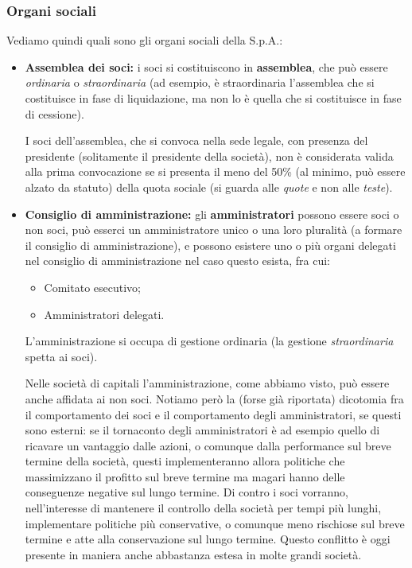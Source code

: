 \documentclass[a4paper,11pt]{article}
\begin{document}
\subsubsection{Organi sociali}
Vediamo quindi quali sono gli organi sociali della S.p.A.: 
\begin{itemize}
	\item
		\textbf{Assemblea dei soci:} i soci si costituiscono in \textbf{assemblea}, che può essere \textit{ordinaria} o \textit{straordinaria} (ad esempio, è straordinaria l'assemblea che si costituisce in fase di liquidazione, ma non lo è quella che si costituisce in fase di cessione).

I soci dell'assemblea, che si convoca nella sede legale, con presenza del presidente (solitamente il presidente della società), non è considerata valida alla prima convocazione se si presenta il meno del 50\% (al minimo, può essere alzato da statuto) della quota sociale (si guarda alle \textit{quote} e non alle \textit{teste}).

\item \textbf{Consiglio di amministrazione:} gli \textbf{amministratori} possono essere soci o non soci, può esserci un amministratore unico o una loro pluralità (a formare il consiglio di amministrazione), e possono esistere uno o più organi delegati nel consiglio di amministrazione nel caso questo esista, fra cui:
		\begin{itemize}
			\item Comitato esecutivo;
			\item Amministratori delegati.
		\end{itemize}
		L'amministrazione si occupa di gestione ordinaria (la gestione \textit{straordinaria} spetta ai soci).

Nelle società di capitali l'amministrazione, come abbiamo visto, può essere anche affidata ai non soci.
Notiamo però la (forse già riportata) dicotomia fra il comportamento dei soci e il comportamento degli amministratori, se questi sono esterni: se il tornaconto degli amministratori è ad esempio quello di ricavare un vantaggio dalle azioni, o comunque dalla performance sul breve termine della società, questi implementeranno allora politiche che massimizzano il profitto sul breve termine ma magari hanno delle conseguenze negative sul lungo termine.
Di contro i soci vorranno, nell'interesse di mantenere il controllo della società per tempi più lunghi, implementare politiche più conservative, o comunque meno rischiose sul breve termine e atte alla conservazione sul lungo termine.
Questo conflitto è oggi presente in maniera anche abbastanza estesa in molte grandi società.


\end{itemize}
\end{document}
